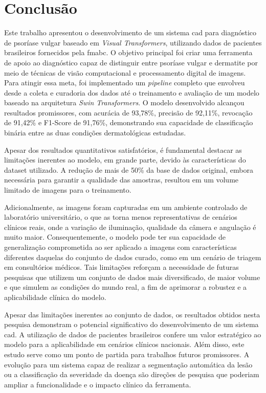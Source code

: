\section{Conclusão}

Este trabalho apresentou o desenvolvimento de um sistema \gls{cad} para diagnóstico de psoríase vulgar baseado em \textit{Visual Transformers}, utilizando dados de pacientes brasileiros fornecidos pela \gls{fmabc}. O objetivo principal foi criar uma ferramenta de apoio ao diagnóstico capaz de distinguir entre psoríase vulgar e dermatite por meio de técnicas de visão computacional e processamento digital de imagens. Para atingir essa meta, foi implementado um \textit{pipeline} completo que envolveu desde a coleta e curadoria dos dados até o treinamento e avaliação de um modelo baseado na arquitetura \textit{Swin Transformers}. O modelo desenvolvido alcançou resultados promissores, com acurácia de 93,78\%, precisão de 92,11\%, revocação de 91,42\% e F1-Score de 91,76\%, demonstrando sua capacidade de classificação binária entre as duas condições dermatológicas estudadas.

Apesar dos resultados quantitativos satisfatórios, é fundamental destacar as limitações inerentes ao modelo, em grande parte, devido às características do dataset utilizado. A redução de mais de 50\% da base de dados original, embora necessária para garantir a qualidade das amostras, resultou em um volume limitado de imagens para o treinamento. 

Adicionalmente, as imagens foram capturadas em um ambiente controlado de laboratório universitário, o que as torna menos representativas de cenários clínicos reais, onde a variação de iluminação, qualidade da câmera e angulação é muito maior. Consequentemente, o modelo pode ter sua capacidade de generalização comprometida ao ser aplicado a imagens com características diferentes daquelas do conjunto de dados curado, como em um cenário de triagem em consultórios médicos. Tais limitações reforçam a necessidade de futuras pesquisas que utilizem um conjunto de dados mais diversificado, de maior volume e que simulem as condições do mundo real, a fim de aprimorar a robustez e a aplicabilidade clínica do modelo.

Apesar das limitações inerentes ao conjunto de dados, os resultados obtidos nesta pesquisa demonstram o potencial significativo do desenvolvimento de um sistema \gls{cad}.
A utilização de dados de pacientes brasileiros confere um valor estratégico ao modelo para a aplicabilidade em cenários clínicos nacionais. Além disso, este estudo serve como um ponto de partida para trabalhos futuros promissores. A evolução para um sistema capaz de realizar a segmentação automática da lesão ou a classificação da severidade da doença são direções de pesquisa que poderiam ampliar a funcionalidade e o impacto clínico da ferramenta.

